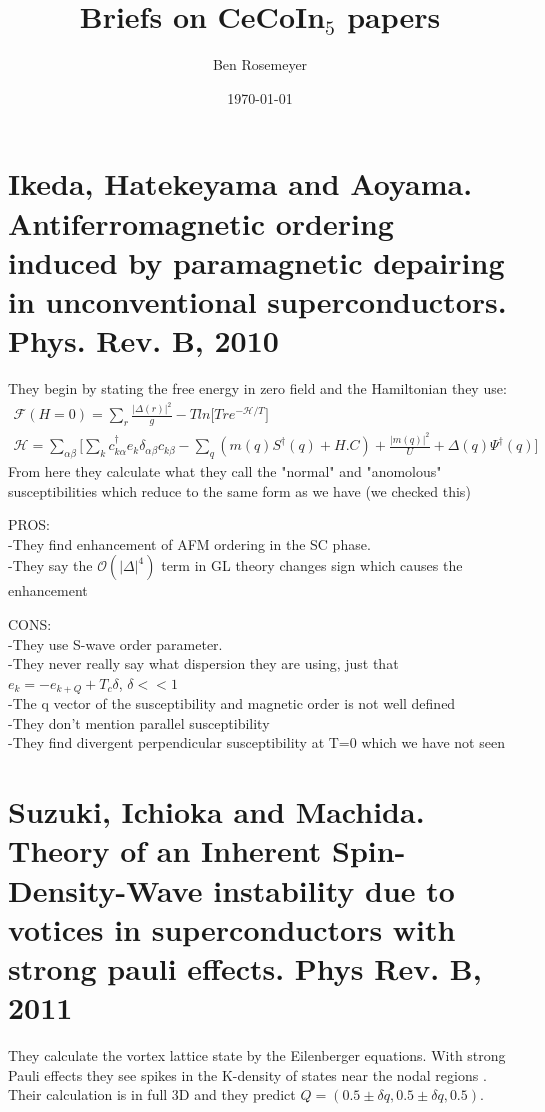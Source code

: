 \documentclass{article}
\begin{document}
\title{Briefs on CeCoIn$_5$ papers}
\author{Ben Rosemeyer}
\date{\today}
\maketitle

\section{Ikeda, Hatekeyama and Aoyama. Antiferromagnetic ordering induced by paramagnetic depairing in unconventional superconductors. Phys. Rev. B, 2010}
They begin by stating the free energy in zero field and the Hamiltonian they use:
\begin{align*}
\mathcal{F}(H=0)=\sum\limits_r \frac{|\Delta(r)|^2}{g}-T ln \bigg[Tr e^{-\mathcal{H}/T} \bigg]\\
\mathcal{H}=\sum\limits_{\alpha\beta} \bigg[\sum\limits_k c^\dagger_{k\alpha} e_k \delta_{\alpha\beta} c_{k\beta} -\sum\limits_q (m(q) S^\dagger(q) +H.C) +\frac{|m(q)|^2}{U}+\Delta(q)\Psi^\dagger(q)\bigg]
\end{align*}
From here they calculate what they call the "normal" and "anomolous" susceptibilities which reduce to the same form as we have (we checked this)

PROS: \\
-They find enhancement of AFM ordering in the SC phase. \\
-They say the $\mathcal{O}(|\Delta|^4)$ term in GL theory changes sign which causes the enhancement

CONS: \\
-They use S-wave order parameter.\\
-They never really say what dispersion they are using, just that $e_k=-e_{k+Q}+T_c\delta$, $\delta<<1$ \\
-The q vector of the susceptibility and magnetic order is not well defined \\
-They don't mention parallel susceptibility \\
-They find divergent perpendicular susceptibility at T=0 which we have not seen

\section{Suzuki, Ichioka and Machida. Theory of an Inherent Spin- Density-Wave instability due to votices in superconductors with strong pauli effects. Phys Rev. B, 2011}
They calculate the vortex lattice state by the Eilenberger equations. With strong Pauli effects they see spikes in the K-density of states near the nodal regions . Their calculation is in full 3D and they predict $Q=(0.5\pm\delta q, 0.5\pm\delta q, 0.5)$.
\end{document}
